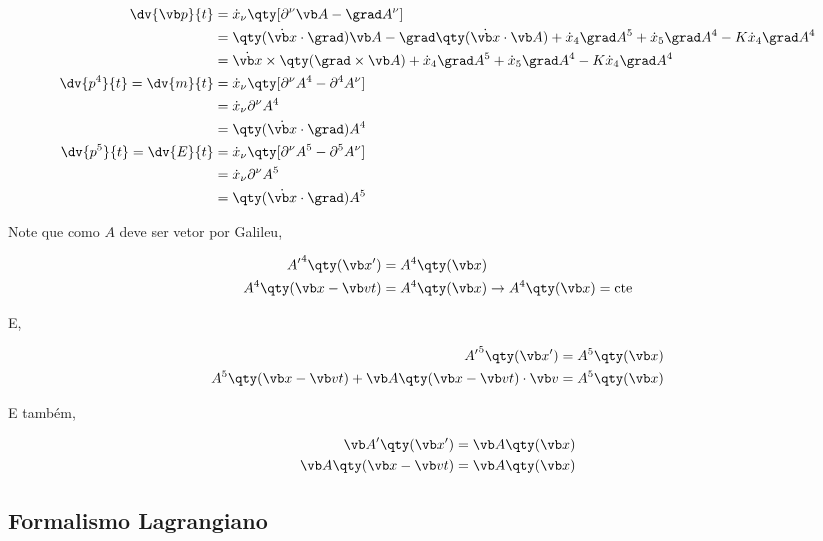 \documentclass[twoside]{amsart}
\numberwithin{equation}{section}
\begin{document}
\begin{refsection}
\begin{align}
    \dv{\vb p}{t}&=\dot x_\nu\qty[\partial^\nu \vb A-\grad A^\nu]\\
    &=\qty(\dot {\vb x}\cdot\grad)\vb A-\grad\qty(\dot{\vb x}\cdot\vb A)+\dot x_4\grad A^5+\dot x_5\grad A^4-K\dot x_4\grad A^4\\
    &=\dot{\vb x}\times\qty(\grad\times \vb A)+\dot x_4\grad A^5+\dot x_5\grad A^4-K\dot x_4\grad A^4\\
    \dv{p^4}{t}=\dv{m}{t}&=\dot x_\nu\qty[\partial^\nu A^4-\partial^4A^\nu]\\
    &=\dot x_\nu\partial^\nu A^4\\
    &=\qty(\dot {\vb x}\cdot\grad )A^4\\
    \dv{p^5}{t}=\dv{E}{t}&=\dot x_\nu\qty[\partial^\nu  A^5-\partial^5 A^\nu]\\
    &=\dot x_\nu\partial^\nu  A^5\\
    &=\qty(\dot {\vb x}\cdot \grad)  A^5
\end{align}

Note que como $A$ deve ser vetor por Galileu,

\begin{align}
    {A'}^4\qty(\vb x ')&=A^4\qty(\vb x)\\
    A^4\qty(\vb x-\vb vt)&=A^4\qty(\vb x)\rightarrow A^4\qty(\vb x)=\textup{cte}
\end{align}

E,

\begin{align}
    {A'}^5\qty(\vb x')&=A^5\qty(\vb x)\\
    {A}^5\qty(\vb x-\vb vt)+\vb A\qty(\vb x-\vb vt)\cdot \vb v&=A^5\qty(\vb x)
\end{align}

E também,

\begin{align}
    {\vb A}'\qty(\vb x')&=\vb A\qty(\vb x)\\
    \vb A\qty(\vb x-\vb v t)&=\vb A\qty(\vb x)
\end{align}

\printbibliography[heading=subbibliography]
\end{refsection}


\begin{refsection}
\section{Formalismo Lagrangiano}



\printbibliography[heading=subbibliography]
\end{refsection}
\end{document}
